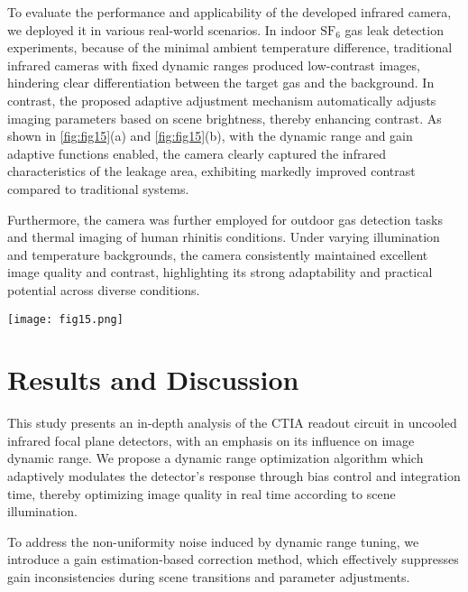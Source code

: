 \documentclass[a4paper,fleqn]{cas-dc}
\begin{document}
To evaluate the performance and applicability of the developed infrared camera, we deployed it in various real-world scenarios. In indoor $\text{SF}_6$ gas leak detection experiments, because of the minimal ambient temperature difference, traditional infrared cameras with fixed dynamic ranges produced low-contrast images, hindering clear differentiation between the target gas and the background. In contrast, the proposed adaptive adjustment mechanism automatically adjusts imaging parameters based on scene brightness, thereby enhancing contrast. As shown in \cref{fig:fig15}(a) and \cref{fig:fig15}(b), with the dynamic range and gain adaptive functions enabled, the camera clearly captured the infrared characteristics of the leakage area, exhibiting markedly improved contrast compared to traditional systems.

Furthermore, the camera was further employed for outdoor gas detection tasks and thermal imaging of human rhinitis conditions. Under varying illumination and temperature backgrounds, the camera consistently maintained excellent image quality and contrast, highlighting its strong adaptability and practical potential across diverse conditions. 


   \begin{figure*}[ht]
    \centering
    \texttt{[image: fig15.png]}
    \caption{Performance of Our Camera in Real-World Scenarios (a) Adaptive Dynamic (b) Fixed Dynamic Range (c) Our Camera Used for External Environment Gas Leak Detection (d) Our Camera Used for Human Body Detection}
    \label{fig:fig15}
\end{figure*}



\section{Results and Discussion}

This study presents an in-depth analysis of the CTIA readout circuit in uncooled infrared focal plane detectors, with an emphasis on its influence on image dynamic range. We propose a dynamic range optimization algorithm which adaptively modulates the detector's response through bias control and integration time, thereby optimizing image quality in real time according to scene illumination. 

To address the non-uniformity noise induced by dynamic range tuning, we introduce a gain estimation-based correction method, which effectively suppresses gain inconsistencies during scene transitions and parameter adjustments.
\end{document}
